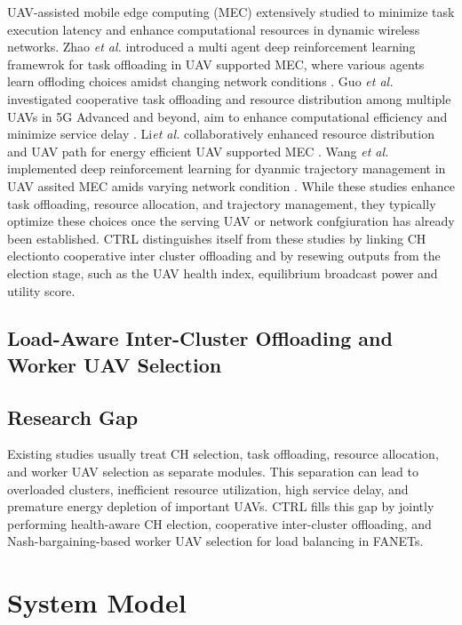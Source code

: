 \documentclass[journal]{IEEEtran}
\begin{document}
UAV-assisted mobile edge computing (MEC) extensively studied to minimize task execution latency and enhance computational resources in dynamic wireless networks. Zhao \emph{et al.} introduced a multi agent deep reinforcement learning framewrok for task offloading in UAV supported MEC, where various agents learn offloding choices amidst changing network conditions \cite{ref1}. Guo \emph{et al.} investigated cooperative task offloading and resource distribution among multiple UAVs in 5G Advanced and beyond, aim to enhance computational efficiency and minimize service delay \cite{ref2}. Li\emph{et al.} collaboratively enhanced resource distribution and UAV path for energy efficient UAV supported MEC \cite{ref16}. Wang \emph{et al.} implemented deep reinforcement learning for dyanmic trajectory management in UAV assited MEC amids varying network condition \cite{ref13}. While these studies enhance task offloading, resource allocation, and trajectory management, they typically optimize these choices once the serving UAV or network confgiuration has already been established. CTRL distinguishes itself from these studies by linking CH electionto cooperative inter cluster offloading and by resewing outputs from the election stage, such as the UAV health index, equilibrium broadcast power and utility score.

\subsection{Load-Aware Inter-Cluster Offloading and Worker UAV Selection}



\subsection{Research Gap}

Existing studies usually treat CH selection, task offloading, resource allocation, and worker UAV selection as separate modules. This separation can lead to overloaded clusters, inefficient resource utilization, high service delay, and premature energy depletion of important UAVs. CTRL fills this gap by jointly performing health-aware CH election, cooperative inter-cluster offloading, and Nash-bargaining-based worker UAV selection for load balancing in FANETs.




\section{System Model}
\end{document}
